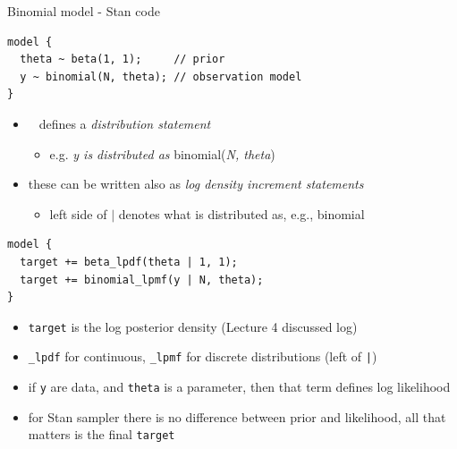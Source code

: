 \documentclass[finnish,english,t]{beamer}
\begin{document}
\begin{frame}[fragile]{Binomial model - Stan code}

  \vspace{-\baselineskip}
  {\small
\begin{verbatim}
model {
  theta ~ beta(1, 1);     // prior
  y ~ binomial(N, theta); // observation model
}
\end{verbatim}
  }

    \vspace{-0.5\baselineskip}
    \begin{itemize}
    \item \texttt{~} defines a \textit{distribution statement}
      \begin{itemize}
      \item[] e.g. \textit{y is distributed as} binomial(\textit{N, theta})
      \end{itemize}
    \item<2-> these can be written also as \textit{log density increment statements}
      \begin{itemize}
      \item[] left side of $|$ denotes what is distributed as, e.g., binomial
      \end{itemize}
    \end{itemize}

    \pause
    \vspace{-0.5\baselineskip}
  {\small
\begin{verbatim}
model {
  target += beta_lpdf(theta | 1, 1);
  target += binomial_lpmf(y | N, theta);
}
\end{verbatim}
  }

    \vspace{-0.5\baselineskip}
    \begin{itemize}
    \item<3-> {\tt target} is the log posterior density (Lecture 4 discussed log)
    \item<4-> {\tt \_lpdf} for continuous, {\tt \_lpmf} for discrete distributions (left of {\tt |})
    \item<5-> if \texttt{y} are data, and \texttt{theta} is a parameter, then that term defines log likelihood
    \item<6-> for Stan sampler there is no difference between prior and likelihood, all that matters is the final {\tt target}
    \end{itemize}

\end{frame} 
\end{document}

